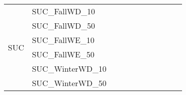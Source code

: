 \begin{table}[]
{\begin{tabular}{|c|l|ll|ll|ll|l|l|l|}
\hline
			\multirow{16}{*}{SUC}   & SUC\_FallWD\_10               &                                   &                                  &                           &                          &                           &                          &                                       &        &                        \\
			& SUC\_FallWD\_50               &                                   &                                  &                           &                          &                           &                          &                                       &                               & \\
			& SUC\_FallWE\_10               &                                   &                                  &                           &                          &                           &                          &                                       &                               & \\
			& SUC\_FallWE\_50               &                                   &                                  &                           &                          &                           &                          &                                       &                               & \\
			& SUC\_WinterWD\_10             &                                   &                                  &                           &                          &                           &                          &                                       &                               & \\
			& SUC\_WinterWD\_50             &                                   &                                  &                           &                          &                           &                          &                                       &                               & \\

\end{tabular}}
\end{table}
